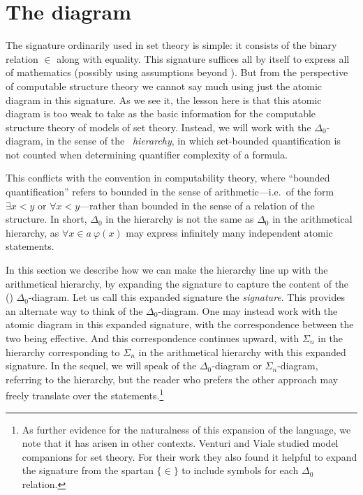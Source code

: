 \documentclass{amsart}
\begin{document}
 \section{The \Levy{} diagram}\label{Section.The-Levy-Diagram}
 
 The signature ordinarily used in set theory is simple: it consists of the binary relation $\in$ along with equality. This
 signature suffices all by itself to express all of mathematics (possibly using assumptions beyond \ZFC). But from the perspective of computable structure theory we cannot say much using just the atomic diagram in this signature. As we see it, the lesson here is that this atomic diagram is too weak to take as the basic information for the computable structure theory of models of set theory. Instead, we will work with the $\Delta_0$-diagram, in the sense of the \emph{\Levy\ hierarchy}, in which set-bounded quantification is not counted when determining quantifier complexity of a formula.
 
 This conflicts with the convention in computability theory, where ``bounded quantification'' refers to bounded in the sense of arithmetic---i.e.\ of the form $\exists x<y$ or $\forall x<y$---rather than bounded in the sense of a relation of the structure. In short, $\Delta_0$ in the \Levy{} hierarchy is not the same as $\Delta_0$ in the arithmetical hierarchy, as $\forall x\in a\ \varphi(x)$ may express infinitely many independent atomic statements.
 
 
 In this section we describe how we can make the \Levy{} hierarchy line up with the arithmetical hierarchy, by
 expanding the signature to capture the content of the (\Levy) $\Delta_0$-diagram. Let us call this expanded signature the \emph{\Levy{} signature}. This provides an alternate way to think of the $\Delta_0$-diagram. One may instead work with the atomic diagram in this expanded signature, with the correspondence between the two being effective. And this correspondence continues upward, with $\Sigma_n$ in the \Levy{} hierarchy corresponding to $\Sigma_n$ in the arithmetical hierarchy with this expanded signature. In the sequel, we will speak of the $\Delta_0$-diagram or $\Sigma_n$-diagram, referring to the \Levy{} hierarchy, but the reader who prefers the other approach may freely translate over the statements.\footnote{As further evidence for the naturalness of this expansion of the language, we note that it has arisen in other contexts. Venturi and Viale \cite{Venture-Viale:submitted} studied model companions for set theory. For their work they also found it helpful to expand the signature from the spartan $\{\in\}$ to include symbols for each $\Delta_0$ relation.}
 
\end{document}
